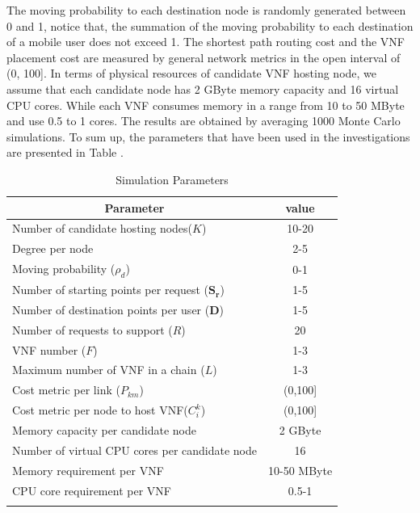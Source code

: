 \documentclass[journal]{IEEEtran}
\begin{document}
The moving probability to each destination node is randomly generated between 0 and 1, notice that, the summation of the moving probability to each destination of a mobile user does not exceed 1. The shortest path routing cost and the VNF placement cost are measured by general network metrics in the open interval of (0, 100]. In terms of physical resources of candidate VNF hosting node, we assume that each candidate node has 2 GByte memory capacity and 16 virtual CPU cores. While each VNF consumes memory in a range from 10 to 50 MByte and use 0.5 to 1 cores.  The results are obtained by averaging 1000 Monte Carlo simulations. To sum up, the parameters that have been used in the investigations are presented in Table \uppercase\expandafter{}.


  \begin{table}[h]
    \caption{Simulation Parameters}
    \label{table1}
    \begin{center}
      \begin{tabular}{@{}lc@{}}
        \toprule
        \multicolumn{1}{c}{Parameter}                     & value      \\ \midrule
        Number of candidate hosting nodes($K$)            & 10-20        \\
        Degree per node                                   & 2-5        \\
        Moving probability ($\rho_{d}$)                   & 0-1        \\
        Number of starting points per request ($\mathbf{S_{r}}$)        & 1-5        \\
        Number of destination points per user ($\mathbf{D}$)            & 1-5        \\
        Number of requests to support ($R$)               &20         \\
        VNF number ($F$)                                  & 1-3         \\
        Maximum number of VNF in a chain ($L$)            & 1-3         \\
        Cost metric per link ($P_{km}$)                   & (0,100]      \\
          Cost metric per node to host VNF($C_{i}^{k}$)     & (0,100]      \\
            Memory capacity per candidate node                & 2 GByte     \\
            Number of virtual CPU cores per candidate node    & 16         \\
            Memory requirement per VNF                        & 10-50 MByte \\
            CPU core requirement per VNF                      & 0.5-1        \\

            \\ \bottomrule

      \end{tabular}
    \end{center}
  \end{table}
\end{document}
